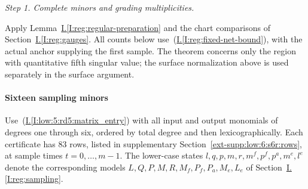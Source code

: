 \documentclass[11pt]{amsart}
\theoremstyle{definition}
\theoremstyle{remark}
\numberwithin{equation}{section}
\newcommand{\partIref}[1]{\hyperref[I:#1]{I.\ref*{I:#1}}}
\newcommand{\partIeqref}[1]{\textup{(\partIref{#1})}}
\begin{document}
\par\smallskip\noindent\textit{Step 1. Complete minors and grading multiplicities.}\par\nobreak\smallskip

Apply Lemma~\partIref{reg:regular-preparation} and the chart comparisons of Section~\partIref{reg:gauges}. All counts below use~\partIeqref{reg:fixed-net-bound}, with the actual anchor supplying the first sample. The theorem concerns only the region with quantitative fifth singular value; the surface normalization above is used separately in the surface argument.

\paragraph{Sixteen sampling minors}\label{low:6:s6r:certificates}

Use~\partIeqref{low:5:rd5:matrix_entry} with all input and output monomials of degrees one through six, ordered by total degree and then lexicographically. Each certificate has $83$ rows, listed in supplementary Section~\ref{ext-supp:low:6:s6r:rows}, at sample times $t=0,\ldots,m-1$. The lower-case states $l,q,p,m,r,m^f,p^f,p^a,m^e,l^e$ denote the corresponding models $L,Q,P,M,R,M_f,P_f,P_a,M_e,L_e$ of Section~\partIref{reg:sampling}.
\end{document}

